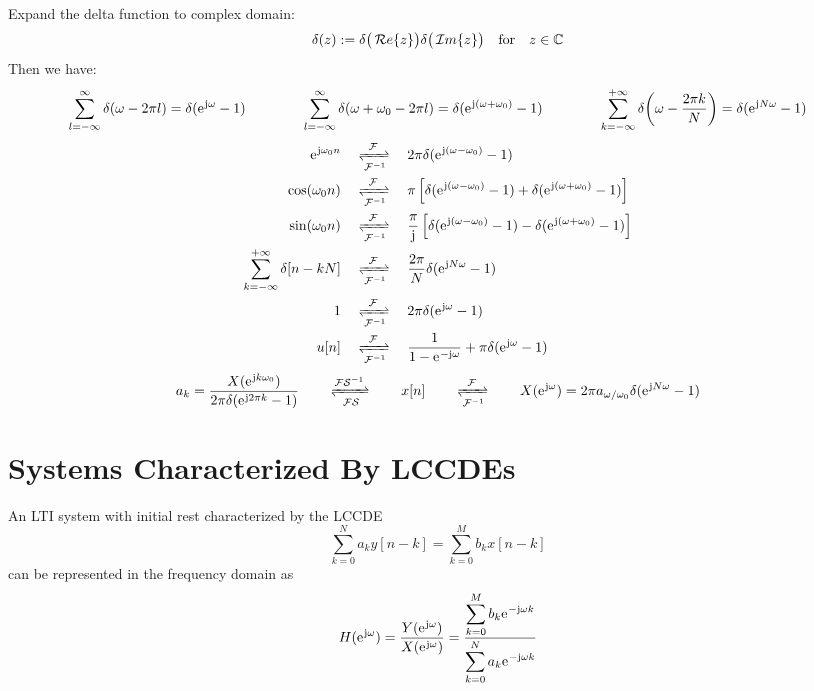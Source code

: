 \documentclass[10pt,UTF8]{article}
\newenvironment{definition box}
{\begin{tcolorbox}[colback=blue!5!white,colframe=blue!75!black,parbox=false,before upper=\par,before lower=\par]}
{\end{tcolorbox}}
\newenvironment{theorem box}
{\begin{tcolorbox}[colback=yellow!5!white,colframe=yellow!75!black,parbox=false,before upper=\par,before lower=\par]}
{\end{tcolorbox}}
\theoremstyle{definition}
\newtheorem{definition inner}{Definition}[section]
\theoremstyle{plain}
\newtheorem{theorem inner}{Theorem}[section]
\theoremstyle{definition}
\newtheorem*{proof inner}{\textit{Proof}}
\theoremstyle{remark}
\newcommand{\ju}{\mathrm{j}}  %
\newcommand{\e}{\mathrm{e}{\mkern 1 mu}}
\renewcommand{\Re}{\,\mathcal{R}\ensuremath{e}\qty}
\renewcommand{\Im}{\,\mathcal{I}\ensuremath{m}\qty}
\begin{document}
Expand the delta function to complex domain:
\begin{equation*}
    \delta(z) := \delta\big(\Re{z}\big)\delta\big(\Im{z}\big)
    \qfor z \in \mathbb{C}
\end{equation*}
Then we have:
\begin{equation*}
    \sum_{l=-\infty}^{\infty}\delta(\omega-2\pi l) = \delta(\e^{\ju\omega}-1)
    \qquad\qquad
    \sum_{l=-\infty}^{\infty}\delta(\omega+\omega_0-2\pi l)
    = \delta(\e^{\ju(\omega+\omega_0)}-1)
    \qquad\qquad
    \sum_{k=-\infty}^{+\infty}\delta\qty(\omega-\frac{2\pi k}{N})
    = \delta(\e^{\ju N\omega}-1)
\end{equation*}
\begin{align*}
    \e^{\ju\omega_0 n}
    \quad&\xrightleftharpoons[\mathcal{F}^{-1}]{\mathcal{F}}\quad
    2\pi \delta(\e^{\ju(\omega-\omega_0)}-1) \\
    \cos(\omega_0 n)
    \quad&\xrightleftharpoons[\mathcal{F}^{-1}]{\mathcal{F}}\quad
    \pi \left[
        \delta(\e^{\ju(\omega-\omega_0)}-1) +
        \delta(\e^{\ju(\omega+\omega_0)}-1)
    \right] \\
    \sin(\omega_0 n)
    \quad&\xrightleftharpoons[\mathcal{F}^{-1}]{\mathcal{F}}\quad
    \frac{\pi}{\ju} \left[
        \delta(\e^{\ju(\omega-\omega_0)}-1) -
        \delta(\e^{\ju(\omega+\omega_0)}-1)
    \right] \\
    \sum_{k=-\infty}^{+\infty}\delta[n-k N]
    \quad&\xrightleftharpoons[\mathcal{F}^{-1}]{\mathcal{F}}\quad
    \frac{2\pi}{N}\delta(\e^{\ju N\omega}-1) \\
    1
    \quad&\xrightleftharpoons[\mathcal{F}^{-1}]{\mathcal{F}}\quad
    2\pi \delta(\e^{\ju\omega}-1) \\
    u[n]
    \quad&\xrightleftharpoons[\mathcal{F}^{-1}]{\mathcal{F}}\quad
    \frac{1}{1-\e^{-\ju\omega}} + \pi\delta(\e^{\ju\omega}-1) \\
\end{align*}
\begin{equation*}
    a_k = \frac{X(\e^{\ju k\omega_0})}{2\pi\delta(\e^{\ju 2\pi k}-1)}
    \qquad\xrightleftharpoons[\mathcal{FS}]{\mathcal{FS}^{-1}}\qquad
    x[n]
    \qquad\xrightleftharpoons[\mathcal{F}^{-1}]{\mathcal{F}}\qquad
    X(\e^{\ju\omega}) = 2\pi a_{\omega/\omega_0}\delta(\e^{\ju N\omega}-1)
\end{equation*}

\section{Systems Characterized By LCCDEs}

An LTI system with initial rest characterized by the LCCDE
\begin{equation*}
    \sum_{k=0}^{N} a_k y[n-k] =
    \sum_{k=0}^{M} b_k x[n-k]
\end{equation*}
can be represented in the frequency domain as
\begin{equation*}
    H(\e^{\ju\omega}) =
    \frac{Y(\e^{\ju\omega})}{X(\e^{\ju\omega})} =
    \frac{\displaystyle\sum_{k=0}^{M} b_k \e^{-\ju\omega k}}
    {\displaystyle\sum_{k=0}^{N} a_k \e^{-\ju\omega k}}
\end{equation*}
\end{document}
